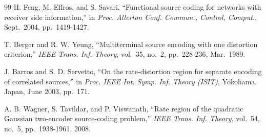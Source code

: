 \documentclass[11pt,draftclsnofoot,onecolumn]{IEEEtran}
\begin{document}
\begin{thebibliography}{99}
 H. Feng, M. Effros, and S. Savari, ``Functional source coding for
networks with receiver side information,''
in \textit{Proc. Allerton Conf.
Commun., Control, Comput.}, Sept.~2004, pp.~1419-1427.

 T. Berger and R. W. Yeung, ``Multiterminal source encoding with
one distortion criterion,''
 \textit{IEEE Trans. Inf. Theory}, vol.~35, no.~2, pp.~228-236, Mar.~1989.

 J. Barros and S. D. Servetto, ``On the rate-distortion region for separate
encoding of correlated sources,'' in \textit{Proc. IEEE Int. Symp. Inf. Theory (ISIT)}, Yokohama, Japan, June 2003, pp.~171.


 A. B. Wagner, S. Tavildar, and P. Viswanath, ``Rate region of the quadratic Gaussian two-encoder source-coding problem,''
    \textit{IEEE Trans. Inf. Theory}, vol.~54, no.~5, pp.~1938-1961, 2008.



%
%
%






	


\end{thebibliography}
\end{document}
